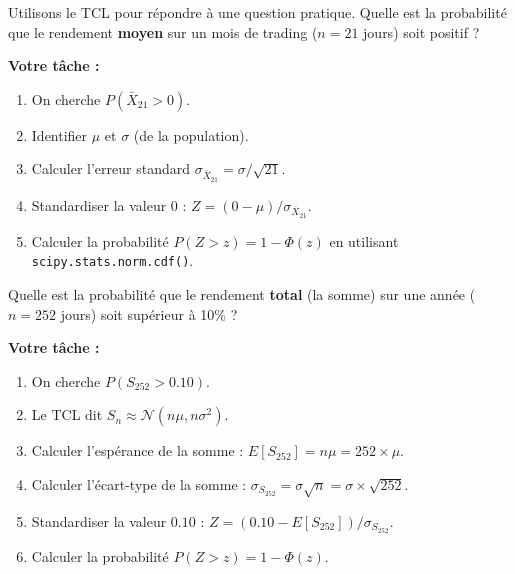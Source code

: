 \begin{exercicebox}
Utilisons le TCL pour répondre à une question pratique.
Quelle est la probabilité que le rendement \textbf{moyen} sur un mois de trading ($n=21$ jours) soit positif ?

\textbf{Votre tâche :}
\begin{enumerate}
    \item On cherche $P(\bar{X}_{21} > 0)$.
    \item Identifier $\mu$ et $\sigma$ (de la population).
    \item Calculer l'erreur standard $\sigma_{\bar{X}_{21}} = \sigma / \sqrt{21}$.
    \item Standardiser la valeur $0$ : $Z = (0 - \mu) / \sigma_{\bar{X}_{21}}$.
    \item Calculer la probabilité $P(Z > z) = 1 - \Phi(z)$ en utilisant \texttt{scipy.stats.norm.cdf()}.
\end{enumerate}
\end{exercicebox}

\begin{exercicebox}
Quelle est la probabilité que le rendement \textbf{total} (la somme) sur une année ($n=252$ jours) soit supérieur à 10\% ?

\textbf{Votre tâche :}
\begin{enumerate}
    \item On cherche $P(S_{252} > 0.10)$.
    \item Le TCL dit $S_n \approx \mathcal{N}(n\mu, n\sigma^2)$.
    \item Calculer l'espérance de la somme : $E[S_{252}] = n\mu = 252 \times \mu$.
    \item Calculer l'écart-type de la somme : $\sigma_{S_{252}} = \sigma \sqrt{n} = \sigma \times \sqrt{252}$.
    \item Standardiser la valeur $0.10$ : $Z = (0.10 - E[S_{252}]) / \sigma_{S_{252}}$.
    \item Calculer la probabilité $P(Z > z) = 1 - \Phi(z)$.
\end{enumerate}
\end{exercicebox}

